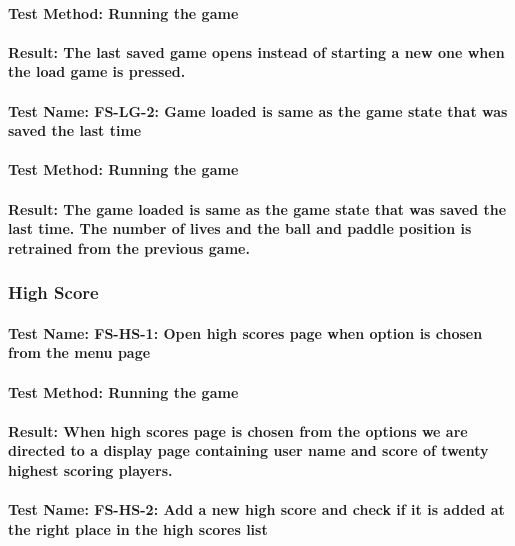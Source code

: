 \documentclass[12pt, titlepage]{article}
\begin{document}
\paragraph {Test Method: Running the game}
\paragraph {Result: The last saved game opens instead of starting a new one when the load game is pressed.}

\paragraph {Test Name: FS-LG-2: Game loaded is same as the game state that was saved the last time}
\paragraph {Test Method: Running the game}
\paragraph {Result: The game loaded is same as the game state that was saved the last time. The number of lives and the ball and paddle position is retrained from the previous game.}

\subsubsection {High Score} 
\paragraph {Test Name: FS-HS-1: Open high scores page when option is chosen from the menu page}
\paragraph {Test Method: Running the game}
\paragraph {Result: When high scores page is chosen from the options we are directed to a display page containing user name and score of twenty highest scoring players.}

\paragraph {Test Name: FS-HS-2: Add a new high score and check if it is added at the right place in the high scores list}
\end{document}
